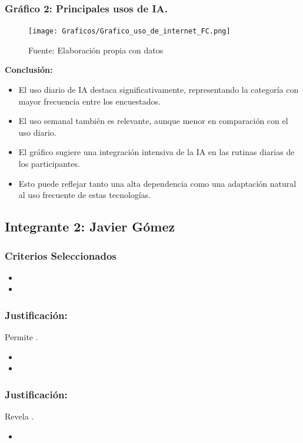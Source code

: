\documentclass[12pt, a4paper]{article}
\begin{document}
\subsubsection*{Gráfico 2: Principales usos de IA.}
\begin{figure}[H]
    \centering
    \texttt{[image: Graficos/Grafico\_uso\_de\_internet\_FC.png]}
    \caption[2]{Fuente: Elaboración propia con datos}
\end{figure}

\textbf{Conclusión:}
\begin{itemize}
    \item El uso diario de IA destaca significativamente, representando la categoría con mayor frecuencia entre los encuestados.
    \item El uso semanal también es relevante, aunque menor en comparación con el uso diario.
    \item El gráfico sugiere una integración intensiva de la IA en las rutinas diarias de los participantes.
    \item Esto puede reflejar tanto una alta dependencia como una adaptación natural al uso frecuente de estas tecnologías.
\end{itemize}


\newpage
\subsection*{Integrante 2: Javier Gómez}

\subsubsection*{Criterios Seleccionados}
\begin{itemize}
    \item 
    \item 
\end{itemize}

\subsubsection*{Justificación: }
Permite .

\begin{itemize}
    \item 
    \item 
\end{itemize}

\subsubsection*{Justificación: }
Revela .
\begin{itemize}
    \item 
\end{itemize}
\end{document}
